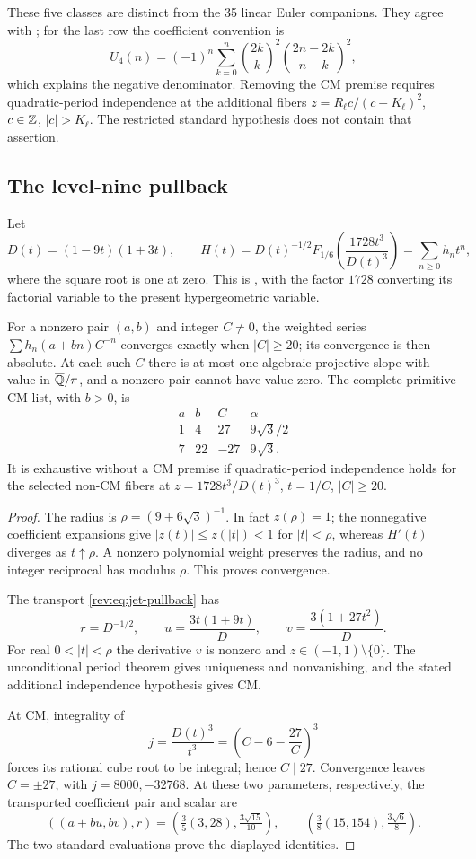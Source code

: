 These five classes are distinct from the 35 linear Euler companions.
They agree with \cite[Tables~13 and 15]{CGG}; for the last row the
coefficient convention is
\[
 U_4(n)=(-1)^n\sum_{k=0}^n
   \binom{2k}{k}^{\!2}\binom{2n-2k}{n-k}^{\!2},
\]
which explains the negative denominator. Removing the CM premise
requires quadratic-period independence at the additional fibers
$z=R_\ell c/(c+K_\ell)^2$, $c\in\mathbb Z$, $|c|>K_\ell$.
The restricted standard hypothesis does not contain that assertion.

\subsection{The level-nine pullback}\label{sec:nine}
Let
\[
 D(t)=(1-9t)(1+3t),\qquad
 H(t)=D(t)^{-1/2}F_{1/6}\!\left(\frac{1728t^3}{D(t)^3}\right)
      =\sum_{n\ge0}h_nt^n,
\]
where the square root is one at zero. This is
\cite[Theorem~9.2, $\ell=1$]{CCY}, with the factor $1728$ converting
its factorial variable to the present hypergeometric variable.

\begin{theorem}\label{thm:nine}
For a nonzero pair $(a,b)$ and integer $C\ne0$, the weighted series
$\sum h_n(a+bn)C^{-n}$ converges exactly when $|C|\ge20$; its
convergence is then absolute. At each such $C$ there is at most one
algebraic projective slope with value in $\overline{\mathbb Q}/\pi$, and a nonzero
pair cannot have value zero. The complete primitive CM list, with
$b>0$, is
\[
\begin{array}{rrr|l}
 a&b&C&\alpha\\\hline
 1&4&27&9\sqrt3/2\\
 7&22&-27&9\sqrt3.
\end{array}
\]
It is exhaustive without a CM premise if quadratic-period independence
holds for the selected non-CM fibers at
$z=1728t^3/D(t)^3$, $t=1/C$, $|C|\ge20$.
\end{theorem}
\begin{proof}
The radius is $\rho=(9+6\sqrt3)^{-1}$. In fact $z(\rho)=1$;
the nonnegative coefficient expansions give $|z(t)|\le z(|t|)<1$
for $|t|<\rho$, whereas $H'(t)$ diverges as $t\uparrow\rho$.
A nonzero polynomial weight preserves the radius, and no integer
reciprocal has modulus $\rho$. This proves convergence.

The transport \eqref{rev:eq:jet-pullback} has
\[
 r=D^{-1/2},\qquad
 u=\frac{3t(1+9t)}D,\qquad v=\frac{3(1+27t^2)}D.
\]
For real $0<|t|<\rho$ the derivative $v$ is nonzero and
$z\in(-1,1)\setminus\{0\}$. The unconditional period theorem gives
uniqueness and nonvanishing, and the stated additional independence
hypothesis gives CM.

At CM, integrality of
\[
 j=\frac{D(t)^3}{t^3}=\left(C-6-\frac{27}C\right)^3
\]
forces its rational cube root to be integral; hence $C\mid27$.
Convergence leaves $C=\pm27$, with $j=8000,-32768$. At these two
parameters, respectively, the transported coefficient pair and scalar
are
\[
 ((a+bu,bv),r)
 =\left(\tfrac35(3,28),\tfrac{3\sqrt{15}}{10}\right),\qquad
   \left(\tfrac38(15,154),\tfrac{3\sqrt6}{8}\right).
\]
The two standard evaluations prove the displayed identities.
\end{proof}

